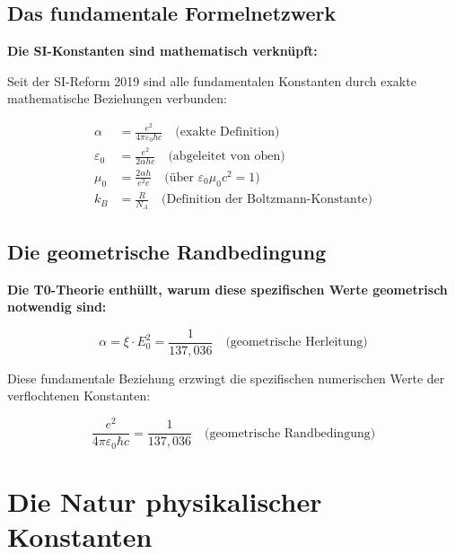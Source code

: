 \documentclass[12pt,a4paper]{article}
\begin{document}
	\subsection{Das fundamentale Formelnetzwerk}
	
	\begin{derivation}
		\textbf{Die SI-Konstanten sind mathematisch verkn{\"u}pft:}
		
		Seit der SI-Reform 2019 sind alle fundamentalen Konstanten durch exakte mathematische Beziehungen verbunden:
		
		\begin{align}
			\alpha &= \frac{e^2}{4\pi\varepsilon_0\hbar c} \quad \text{(exakte Definition)} \\
			\varepsilon_0 &= \frac{e^2}{2\alpha h c} \quad \text{(abgeleitet von oben)} \\
			\mu_0 &= \frac{2\alpha h}{e^2 c} \quad \text{({\"u}ber } \varepsilon_0\mu_0c^2 = 1) \\
			k_B &= \frac{R}{N_A} \quad \text{(Definition der Boltzmann-Konstante)}
		\end{align}
	\end{derivation}
	
	\subsection{Die geometrische Randbedingung}
	
	\begin{insight}
		\textbf{Die T0-Theorie enth{\"u}llt, warum diese spezifischen Werte geometrisch notwendig sind:}
		
		\begin{equation}
			\alpha = \xi \cdot E_0^2 = \frac{1}{137{,}036} \quad \text{(geometrische Herleitung)}
		\end{equation}
		
		Diese fundamentale Beziehung erzwingt die spezifischen numerischen Werte der verflochtenen Konstanten:
		
		\begin{equation}
			\frac{e^2}{4\pi\varepsilon_0\hbar c} = \frac{1}{137{,}036} \quad \text{(geometrische Randbedingung)}
		\end{equation}
	\end{insight}
	
	\section{Die Natur physikalischer Konstanten}
	
\end{document}
